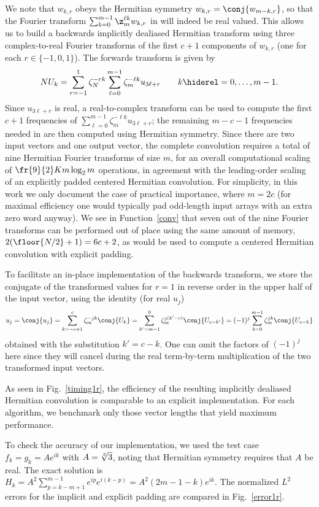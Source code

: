 \documentclass[final]{siamltex}
\def\bel{\begin{dmath}}
\def\eel{\end{dmath}}
\def\no{\hiderel}
\begin{document}
We note that $w_{k,r}$ obeys the Hermitian symmetry 
$w_{k,r}=\conj{w_{m-k,r}}$, so that the Fourier transform
$\sum_{k=0}^{m-1}\z_m^{\ell k} w_{k,r}$ in  will indeed
be real valued. This allows us to build a backwards implicitly dealiased
Hermitian transform using three complex-to-real Fourier transforms of the
first $c+1$ components of $w_{k,r}$ (one for each $r\in\{-1,0,1\}$). The
forwards transform is given by
\bel
NU_k
=\sum_{r=-1}^{1}\zeta_N^{-rk}\sum_{\ell=0}^{m-1}\zeta_m^{-\ell k} u_{3\ell+r}
\qquad k\no =0,\ldots,m-1.\label{fft0forwardsB}
\eel
Since $u_{3\ell+r}$ is real, a real-to-complex transform can be used to
compute the first $c+1$ frequencies of
$\sum_{\ell=0}^{m-1}\zeta_m^{-\ell k} u_{3\ell+r}$; the remaining $m-c-1$
frequencies needed in  are then computed using Hermitian
symmetry. Since there are two input vectors and
one output vector, the complete convolution requires a total of nine
Hermitian Fourier transforms of size $m$, for an overall computational
scaling of $\fr{9}{2}K m \log_2 m$ operations, in agreement with the
leading-order scaling of an explicitly padded centered Hermitian convolution.
For simplicity, in this work we only document the case of practical
importance, where $m=2c$ (for maximal efficiency one would typically pad
odd-length input arrays with an extra zero word anyway). We see in
Function~\ref{conv} that seven out of the nine Fourier transforms can be
performed out of place using the same amount of memory,
$2(\floor{N/2}+1)=6c+2$, as would be used to compute a centered Hermitian
convolution with explicit padding. 

To facilitate an in-place implementation of the
backwards transform, we store the conjugate of the transformed values for
$r=1$ in reverse order in the upper half of the input vector,
using the identity (for real $u_j$)
$$
u_j=\conj{u_j}=\sum_{k=-c+1}^{c}\zeta_m^{-jk} \conj{U_k}
=\sum_{k'=m-1}^{0}\zeta_m^{j(k'-c)} \conj{U_{c-k'}}
=(-1)^j\sum_{k=0}^{m-1}\zeta_m^{jk} \conj{U_{c-k}}
$$
obtained with the substitution $k'=c-k$. One can omit the factors of
$(-1)^j$ here since they will cancel during the real term-by-term multiplication
of the two transformed input vectors.

As seen in Fig.~\ref{timing1r}, the efficiency of the resulting implicitly
dealiased Hermitian convolution is comparable to an explicit implementation.
For each algorithm, we benchmark only those vector lengths that yield
maximum performance.

To check the accuracy of our implementation, we used the test case
$f_k=g_k=A e^{ik}$ with $A=\root3\of 3$, noting that Hermitian symmetry
requires that $A$ be real. The exact solution is 
$H_k=A^2\sum_{p=k-m+1}^{m-1} e^{ip}e^{i(k-p)}=A^2(2m-1-k)e^{ik}$.
The normalized $L^2$ errors for the implicit and explicit padding are compared
in Fig.~\ref{error1r}.
\end{document}
